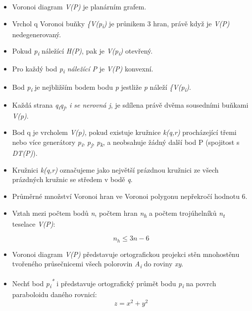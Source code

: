 \begin{itemize}
\item Voronoi diagram \textit{V(P)} je planárním grafem.
\item Vrchol q Voronoi buňky \textit{\{V(p\textsubscript{i})} je průnikem 3 hran, právě když je \textit{V(P)} nedegenerovaný.
\item Pokud \textit{p\textsubscript{i}} náležící \textit{H(P)}, pak je \textit{V(p\textsubscript{i})}  otevřený. 
\item Pro každý bod \textit{p\textsubscript{i} náležící P} je \textit{V(P)} konvexní. 
\item Bod \textit{p\textsubscript{i}} je nejbližším bodem bodu \textit{p}
jestliže \textit{p} náleží \textit{\{V(p\textsubscript{i})}.
\item Každá strana \textit{q\textsubscript{i}q\textsubscript{j}}, \textit{i se nerovná j},
je sdílena právě dvěma sousedními buňkami \textit{V(p)}. 
\item Bod q je vrcholem \textit{V(p)}, pokud existuje kružnice \textit{k(q,r)} procházející třemi
nebo více generátory \textit{p\textsubscript{i}}, \textit{p\textsubscript{j}},
\textit{p\textsubscript{k}}, a neobsahuje žádný další bod P (spojitost s \textit{DT(P)}). 
\item Kružnici \textit{k(q,r)} označujeme jako největší prázdnou kružnici ze všech prázdných kružnic se středem v bodě \textit{q}. 
\item Průměrné množství Voronoi hran ve Voronoi polygonu nepřekročí hodnotu 6. 
\item Vztah mezi počtem bodů \textit{n}, počtem hran \textit{n\textsubscript{h}}
a počtem trojúhelníků \textit{n\textsubscript{t}} teselace \textit{V(P)}:

\[ n_h \leq 3n-6\]

\item Voronoi diagram \textit{V(P)} představuje ortografickou projekci stěn
mnohostěnu tvořeného průsečnicemi všech polorovin \textit{A\textsubscript{i}} do roviny \textit{xy}. 
\item Nechť bod \textit{p\textsubscript{i}\textsuperscript{*}} i představuje
ortografický průmět bodu \textit{p\textsubscript{i}} na povrch paraboloidu daného rovnicí:
\[ z = x^2 + y^2 \]
   
\end{itemize} 

